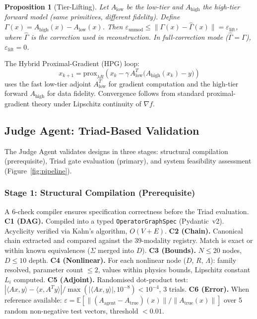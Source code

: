 \documentclass[11pt,a4paper]{article}
\newtheorem{proposition}[theorem]{Proposition}
\newcommand{\eps}{\varepsilon}
\newcommand{\Atrue}{A_{\text{true}}}
\newcommand{\Aagent}{A_{\text{agent}}}
\begin{document}
\begin{proposition}[Tier-Lifting]
\label{prop:tierlift}
Let $A_{\text{low}}$ be the low-tier and $A_{\text{high}}$ the high-tier forward model (same primitives, different fidelity).  Define $\Gamma(x) = A_{\text{high}}(x) - A_{\text{low}}(x)$.  Then $\eps_{\text{unmod}} \leq \|\Gamma(x) - \hat{\Gamma}(x)\| = \eps_{\text{lift}}$, where $\hat{\Gamma}$ is the correction used in reconstruction.  In full-correction mode ($\hat{\Gamma} = \Gamma$), $\eps_{\text{lift}} = 0$.
\end{proposition}

The Hybrid Proximal-Gradient (HPG) loop:
\[
x_{k+1} = \mathrm{prox}_{\lambda R}\!\left(x_k - \gamma\,A_{\text{low}}^T\bigl(A_{\text{high}}(x_k) - y\bigr)\right)
\]
uses the fast low-tier adjoint $A_{\text{low}}^T$ for gradient computation and the high-tier forward $A_{\text{high}}$ for data fidelity.  Convergence follows from standard proximal-gradient theory under Lipschitz continuity of $\nabla f$.

\subsection{Judge Agent: Triad-Based Validation}

The Judge Agent validates designs in three stages: structural compilation (prerequisite), Triad gate evaluation (primary), and system feasibility assessment (Figure~\ref{fig:pipeline}).

\subsubsection{Stage 1: Structural Compilation (Prerequisite)}

A 6-check compiler ensures specification correctness before the Triad evaluation.
\textbf{C1 (DAG).}  Compiled into a typed \texttt{OperatorGraphSpec} (Pydantic~v2).  Acyclicity verified via Kahn's algorithm, $O(V{+}E)$.
\textbf{C2 (Chain).}  Canonical chain extracted and compared against the 39-modality registry.  Match is exact or within known equivalences ($\Sigma$ merged into $D$).
\textbf{C3 (Bounds).}  $N \leq 20$ nodes, $D \leq 10$ depth.
\textbf{C4 (Nonlinear).}  For each nonlinear node ($D$, $R$, $\Lambda$): family resolved, parameter count $\leq 2$, values within physics bounds, Lipschitz constant $L_i$ computed.
\textbf{C5 (Adjoint).}  Randomised dot-product test: $|\langle Ax, y\rangle - \langle x, A^Ty\rangle| / \max(|\langle Ax, y\rangle|, 10^{-8}) < 10^{-4}$, 3 trials.
\textbf{C6 (Error).}  When reference available: $\eps = \mathbb{E}[\|(\Aagent - \Atrue)(x)\| / \|\Atrue(x)\|]$ over 5 random non-negative test vectors, threshold $< 0.01$.
\end{document}
